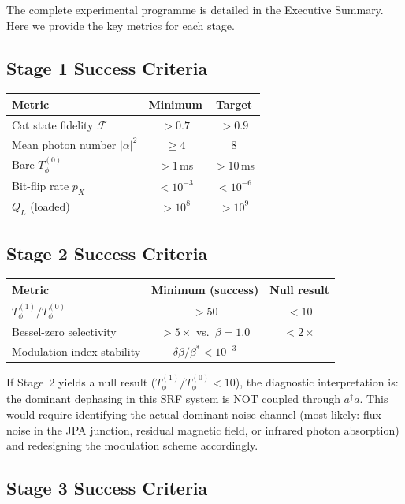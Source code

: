 \documentclass[11pt]{article}
\theoremstyle{definition}
\theoremstyle{remark}
\begin{document}
The complete experimental programme is detailed in the Executive
Summary.  Here we provide the key metrics for each stage.

\subsection{Stage 1 Success Criteria}

\begin{center}
\begin{tabular}{@{}lcc@{}}
\toprule
Metric & Minimum & Target \\
\midrule
Cat state fidelity $\mathcal{F}$ & $> 0.7$ & $> 0.9$ \\
Mean photon number $|\alpha|^2$ & $\geq 4$ & $8$ \\
Bare $T_\phi^{(0)}$ & $> 1$\,ms & $> 10$\,ms \\
Bit-flip rate $p_X$ & $< 10^{-3}$ & $< 10^{-6}$ \\
$Q_L$ (loaded) & $> 10^8$ & $> 10^9$ \\
\bottomrule
\end{tabular}
\end{center}

\subsection{Stage 2 Success Criteria}

\begin{center}
\begin{tabular}{@{}lcc@{}}
\toprule
Metric & Minimum (success) & Null result \\
\midrule
$T_\phi^{(1)} / T_\phi^{(0)}$ & $> 50$ & $< 10$ \\
Bessel-zero selectivity & $> 5\times$ vs.\ $\beta = 1.0$ & $< 2\times$ \\
Modulation index stability & $\delta\beta/\beta^* < 10^{-3}$ & --- \\
\bottomrule
\end{tabular}
\end{center}

If Stage~2 yields a null result ($T_\phi^{(1)}/T_\phi^{(0)} < 10$),
the diagnostic interpretation is: the dominant dephasing in this SRF
system is NOT coupled through $a^\dagger a$.  This would require
identifying the actual dominant noise channel (most likely: flux noise
in the JPA junction, residual magnetic field, or infrared photon
absorption) and redesigning the modulation scheme accordingly.

\subsection{Stage 3 Success Criteria}
\end{document}
